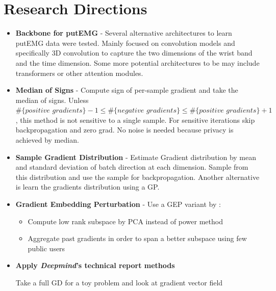 \section{Research Directions}
\begin{itemize}

    \item \textbf{Backbone for putEMG} - Several alternative architectures to learn putEMG data were tested. Mainly focused on convolution models and specifically 3D convolution to capture the two dimensions of the wrist band and the time dimension. Some more potential architectures to be may include transformers or other attention modules.

    \item \textbf{Median of Signs} -  Compute sign of per-sample gradient and take the median of signs. Unless \\ $\#\{ \textit{positive gradients}\} - 1 \leq \#\{\textit{negative gradients}\} \leq \#\{\textit{positive gradients}\} + 1 $, this method is not sensitive to a single sample. For sensitive iterations skip backpropagation and zero grad. No noise is needed because privacy is achieved by median.

    \item \textbf{Sample Gradient Distribution} - Estimate Gradient distribution by mean and standard deviation of batch direction at each dimension. Sample from this distribution and use the sample for backpropagation. Another alternative is learn the gradients distribution using a GP.

    \item \textbf{Gradient Embedding Perturbation} - Use a GEP variant
    by :
    \begin{itemize}
        \item Compute low rank subspace by PCA instead of power method
        \item Aggregate past gradients in order to span a better subspace using few public users
    \end{itemize}



    \item \textbf{Apply \textit{Deepmind}'s technical report \cite{DeUnlockingScale} methods}
    

     Take a full GD for a toy problem and look at gradient vector field
    
\end{itemize}

